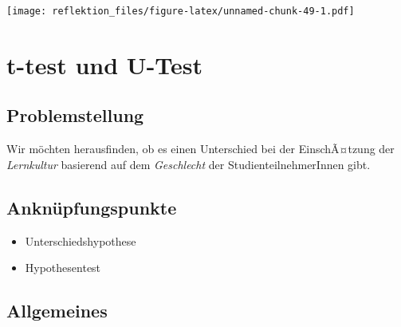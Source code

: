 \documentclass[
]{book}
\providecommand{\tightlist}{%
  \setlength{\itemsep}{0pt}\setlength{\parskip}{0pt}}
\begin{document}
\texttt{[image: reflektion\_files/figure-latex/unnamed-chunk-49-1.pdf]}

\hypertarget{t-test-und-u-test}{%
\chapter{t-test und U-Test}\label{t-test-und-u-test}}

\hypertarget{problemstellung-2}{%
\section{Problemstellung}\label{problemstellung-2}}

Wir möchten herausfinden, ob es einen Unterschied bei der EinschÃ¤tzung der \emph{Lernkultur} basierend auf dem \emph{Geschlecht} der StudienteilnehmerInnen gibt.

\hypertarget{anknuxfcpfungspunkte-4}{%
\section{Anknüpfungspunkte}\label{anknuxfcpfungspunkte-4}}

\begin{itemize}
\tightlist
\item
  Unterschiedshypothese
\item
  Hypothesentest
\end{itemize}

\hypertarget{allgemeines-5}{%
\section{Allgemeines}\label{allgemeines-5}}
\end{document}
